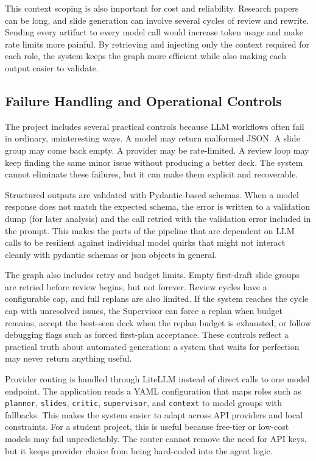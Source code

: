 \documentclass[11pt]{article}
\begin{document}
This context scoping is also important for cost and reliability. Research papers can be long, and slide generation can involve several cycles of review and rewrite. Sending every artifact to every model call would increase token usage and make rate limits more painful. By retrieving and injecting only the context required for each role, the system keeps the graph more efficient while also making each output easier to validate.

\subsection{Failure Handling and Operational Controls}

The project includes several practical controls because LLM workflows often fail in ordinary, uninteresting ways. A model may return malformed JSON. A slide group may come back empty. A provider may be rate-limited. A review loop may keep finding the same minor issue without producing a better deck. The system cannot eliminate these failures, but it can make them explicit and recoverable.

Structured outputs are validated with Pydantic-based schemas. When a model response does not match the expected schema, the error is written to a validation dump (for later analysis) and the call retried with the validation error included in the prompt. This makes the parts of the pipeline that are dependent on LLM calls to be resilient against individual model quirks that might not interact cleanly with pydantic schemas or json objects in general.

The graph also includes retry and budget limits. Empty first-draft slide groups are retried before review begins, but not forever. Review cycles have a configurable cap, and full replans are also limited. If the system reaches the cycle cap with unresolved issues, the Supervisor can force a replan when budget remains, accept the best-seen deck when the replan budget is exhausted, or follow debugging flags such as forced first-plan acceptance. These controls reflect a practical truth about automated generation: a system that waits for perfection may never return anything useful.

Provider routing is handled through LiteLLM instead of direct calls to one model endpoint. The application reads a YAML configuration that maps roles such as \texttt{planner}, \texttt{slides}, \texttt{critic}, \texttt{supervisor}, and \texttt{context} to model groups with fallbacks. This makes the system easier to adapt across API providers and local constraints. For a student project, this is useful because free-tier or low-cost models may fail unpredictably. The router cannot remove the need for API keys, but it keeps provider choice from being hard-coded into the agent logic.
\end{document}
